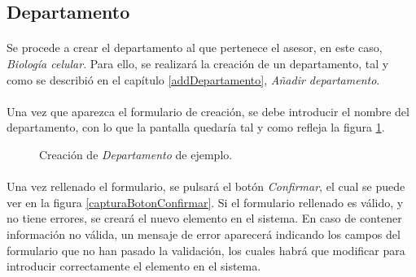 \subsection{Departamento}

  \paragraph{}Se procede a crear el departamento al que pertenece el asesor,
  en este caso, \textit{Biología celular}. Para ello, se realizará
  la creación de un departamento, tal y como se describió en el capítulo
  \ref{addDepartamento}, \textit{Añadir departamento}.

  \paragraph{}Una vez que aparezca el formulario de creación, se debe introducir
  el nombre del departamento, con lo que la pantalla quedaría tal
  y como refleja la figura \ref{ejemploAddDepartamento}.

  \begin{figure}[!ht]
    \begin{center}
      \caption{Creación de \textit{Departamento} de ejemplo.}
      \label{ejemploAddDepartamento}
    \end{center}
  \end{figure}

  \paragraph{}Una vez rellenado el formulario, se pulsará el botón
  \textit{Confirmar}, el cual se puede ver en la figura
  \ref{capturaBotonConfirmar}. Si el formulario rellenado es válido, y no tiene
  errores, se creará el nuevo elemento en el sistema. En caso de contener
  información no válida, un mensaje de error aparecerá indicando los campos
  del formulario que no han pasado la validación, los cuales habrá que modificar
  para introducir correctamente el elemento en el sistema.
